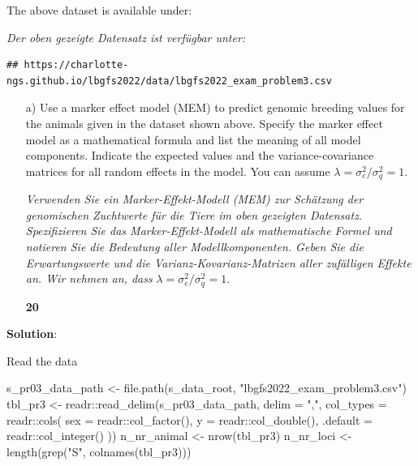 \documentclass[
]{article}
\newenvironment{Shaded}{\begin{snugshade}}{\end{snugshade}}
\newcommand{\AttributeTok}[1]{\textcolor[rgb]{0.77,0.63,0.00}{#1}}
\newcommand{\FunctionTok}[1]{\textcolor[rgb]{0.00,0.00,0.00}{#1}}
\newcommand{\NormalTok}[1]{#1}
\newcommand{\OtherTok}[1]{\textcolor[rgb]{0.56,0.35,0.01}{#1}}
\newcommand{\SpecialCharTok}[1]{\textcolor[rgb]{0.00,0.00,0.00}{#1}}
\newcommand{\StringTok}[1]{\textcolor[rgb]{0.31,0.60,0.02}{#1}}
\newcommand{\points}[1]
{\begin{flushright}\textbf{#1}\end{flushright}}
\newcommand{\solstart}
{\vspace{3ex}\textbf{Solution}:}
\begin{document}
The above dataset is available under:

\textit{Der oben gezeigte Datensatz ist verfügbar unter:}

\begin{verbatim}
## https://charlotte-ngs.github.io/lbgfs2022/data/lbgfs2022_exam_problem3.csv
\end{verbatim}

\vspace{3ex}
\begin{enumerate}
\item[a)] Use a marker effect model (MEM) to predict genomic breeding values for the animals given in the dataset shown above. Specify the marker effect model as a mathematical formula and list the meaning of all model components. Indicate the expected values and the variance-covariance matrices for all random effects in the model. You can assume $\lambda = \sigma_e^2 / \sigma_q^2 = 1$.

\textit{Verwenden Sie ein Marker-Effekt-Modell (MEM) zur Schätzung der genomischen Zuchtwerte für die Tiere im oben gezeigten Datensatz. Spezifizieren Sie das Marker-Effekt-Modell als mathematische Formel und notieren Sie die Bedeutung aller Modellkomponenten. Geben Sie die Erwartungswerte und die Varianz-Kovarianz-Matrizen aller zufälligen Effekte an. Wir nehmen an, dass } $\lambda = \sigma_e^2 / \sigma_q^2 = 1$.
\points{20}
\end{enumerate}

\solstart

Read the data

\begin{Shaded}
\begin{Highlighting}[]
\NormalTok{s\_pr03\_data\_path }\OtherTok{\textless{}{-}} \FunctionTok{file.path}\NormalTok{(s\_data\_root, }\StringTok{"lbgfs2022\_exam\_problem3.csv"}\NormalTok{)}
\NormalTok{tbl\_pr3 }\OtherTok{\textless{}{-}}\NormalTok{ readr}\SpecialCharTok{::}\FunctionTok{read\_delim}\NormalTok{(s\_pr03\_data\_path, }
                             \AttributeTok{delim =} \StringTok{","}\NormalTok{,}
                             \AttributeTok{col\_types =}\NormalTok{ readr}\SpecialCharTok{::}\FunctionTok{cols}\NormalTok{(}
                               \AttributeTok{sex =}\NormalTok{ readr}\SpecialCharTok{::}\FunctionTok{col\_factor}\NormalTok{(),}
                               \AttributeTok{y =}\NormalTok{ readr}\SpecialCharTok{::}\FunctionTok{col\_double}\NormalTok{(),}
                               \AttributeTok{.default =}\NormalTok{ readr}\SpecialCharTok{::}\FunctionTok{col\_integer}\NormalTok{()}
\NormalTok{                             ))}
\NormalTok{n\_nr\_animal }\OtherTok{\textless{}{-}} \FunctionTok{nrow}\NormalTok{(tbl\_pr3)}
\NormalTok{n\_nr\_loci }\OtherTok{\textless{}{-}} \FunctionTok{length}\NormalTok{(}\FunctionTok{grep}\NormalTok{(}\StringTok{"S"}\NormalTok{, }\FunctionTok{colnames}\NormalTok{(tbl\_pr3)))}
\end{Highlighting}
\end{Shaded}
\end{document}
